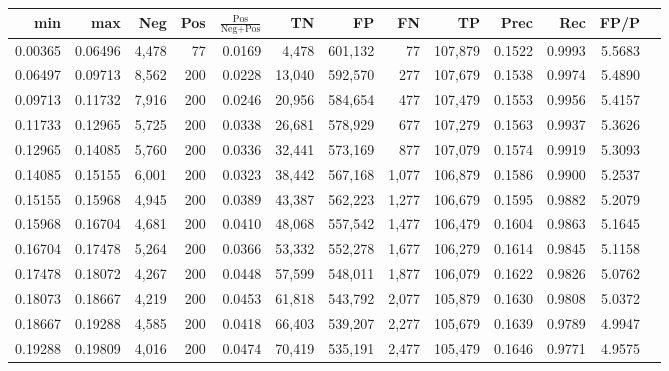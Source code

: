\begin{tabular}{rrrrrrrrrrrrr}
\toprule
    min &     max &   Neg & Pos & $\frac{\text{Pos}}{\text{Neg}+\text{Pos}}$ &      TN &      FP &      FN &      TP &   Prec &    Rec &   FP/P \\
\midrule
0.00365 & 0.06496 & 4,478 &  77 &                                     0.0169 &   4,478 & 601,132 &      77 & 107,879 & 0.1522 & 0.9993 & 5.5683 \\
0.06497 & 0.09713 & 8,562 & 200 &                                     0.0228 &  13,040 & 592,570 &     277 & 107,679 & 0.1538 & 0.9974 & 5.4890 \\
0.09713 & 0.11732 & 7,916 & 200 &                                     0.0246 &  20,956 & 584,654 &     477 & 107,479 & 0.1553 & 0.9956 & 5.4157 \\
0.11733 & 0.12965 & 5,725 & 200 &                                     0.0338 &  26,681 & 578,929 &     677 & 107,279 & 0.1563 & 0.9937 & 5.3626 \\
0.12965 & 0.14085 & 5,760 & 200 &                                     0.0336 &  32,441 & 573,169 &     877 & 107,079 & 0.1574 & 0.9919 & 5.3093 \\
0.14085 & 0.15155 & 6,001 & 200 &                                     0.0323 &  38,442 & 567,168 &   1,077 & 106,879 & 0.1586 & 0.9900 & 5.2537 \\
0.15155 & 0.15968 & 4,945 & 200 &                                     0.0389 &  43,387 & 562,223 &   1,277 & 106,679 & 0.1595 & 0.9882 & 5.2079 \\
0.15968 & 0.16704 & 4,681 & 200 &                                     0.0410 &  48,068 & 557,542 &   1,477 & 106,479 & 0.1604 & 0.9863 & 5.1645 \\
0.16704 & 0.17478 & 5,264 & 200 &                                     0.0366 &  53,332 & 552,278 &   1,677 & 106,279 & 0.1614 & 0.9845 & 5.1158 \\
0.17478 & 0.18072 & 4,267 & 200 &                                     0.0448 &  57,599 & 548,011 &   1,877 & 106,079 & 0.1622 & 0.9826 & 5.0762 \\
0.18073 & 0.18667 & 4,219 & 200 &                                     0.0453 &  61,818 & 543,792 &   2,077 & 105,879 & 0.1630 & 0.9808 & 5.0372 \\
0.18667 & 0.19288 & 4,585 & 200 &                                     0.0418 &  66,403 & 539,207 &   2,277 & 105,679 & 0.1639 & 0.9789 & 4.9947 \\
0.19288 & 0.19809 & 4,016 & 200 &                                     0.0474 &  70,419 & 535,191 &   2,477 & 105,479 & 0.1646 & 0.9771 & 4.9575 \\

\end{tabular}
